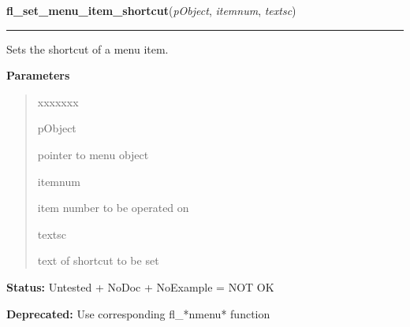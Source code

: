     \label{xformslib:library:fl_set_menu_item_shortcut}

    \vspace{0.5ex}

\hspace{.8\funcindent}\begin{boxedminipage}{\funcwidth}

    \raggedright \textbf{fl\_set\_menu\_item\_shortcut}(\textit{pObject}, \textit{itemnum}, \textit{textsc})

    \vspace{-1.5ex}

    \rule{\textwidth}{0.5\fboxrule}
\setlength{\parskip}{2ex}
    Sets the shortcut of a menu item.

\setlength{\parskip}{1ex}
      \textbf{Parameters}
      \vspace{-1ex}

      \begin{quote}
        \begin{Ventry}{xxxxxxx}

          \item[pObject]

          pointer to menu object

          \item[itemnum]

          item number to be operated on

          \item[textsc]

          text of shortcut to be set

        \end{Ventry}

      \end{quote}

\textbf{Status:} Untested + NoDoc + NoExample = NOT OK



\textbf{Deprecated:} Use corresponding fl\_*nmenu* function



    \end{boxedminipage}

    \label{xformslib:library:fl_set_menu_item_mode}

